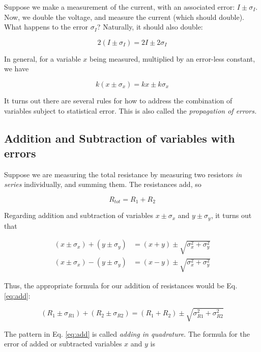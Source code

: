 \documentclass[12pt]{article}
\begin{document}
Suppose we make a measurement of the current, with an associated error: $I\pm \sigma_I$.  Now, we double the voltage, and measure the current (which should double).  What happens to the error $\sigma_I$?  Naturally, it should also double:

\begin{equation}
2(I\pm \sigma_I) = 2I \pm 2\sigma_I
\end{equation}

In general, for a variable $x$ being measured, multiplied by an error-less constant, we have

\begin{equation}
k(x\pm \sigma_x) = kx \pm k\sigma_x
\end{equation}

It turns out there are several rules for how to address the combination of variables subject to statistical error.  This is also called the \textit{propagation of errors.}

\subsection{Addition and Subtraction of variables with errors}

Suppose we are measuring the total resistance by measuring two resistors \textit{in series} individually, and summing them.  The resistances add, so

\begin{equation}
R_{tot} = R_1 + R_2
\end{equation}

Regarding addition and subtraction of variables $x\pm \sigma_x$ and $y\pm \sigma_y$, it turns out that

\begin{align}
(x\pm \sigma_x) + (y\pm \sigma_y) &= (x+y) \pm \sqrt{\sigma_x^2 + \sigma_y^2} \label{eq:add} \\
(x\pm \sigma_x) - (y\pm \sigma_y) &= (x-y) \pm \sqrt{\sigma_x^2 + \sigma_y^2}
\end{align}

Thus, the appropriate formula for our addition of resistances would be Eq. \ref{eq:add}:

\begin{equation}
(R_{1} \pm \sigma_{R1}) + (R_{2} \pm \sigma_{R2}) = (R_{1}+R_{2}) \pm \sqrt{\sigma_{R1}^2 + \sigma_{R2}^2}
\end{equation}

The pattern in Eq. \ref{eq:add} is called \textit{adding in quadrature}.  The formula for the error of added or subtracted variables $x$ and $y$ is
\end{document}
